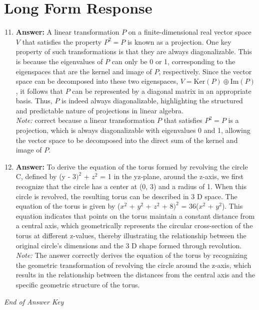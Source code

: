 \documentclass[12pt]{article}
\begin{document}
\section*{Long Form Response}
\begin{enumerate}[label=\arabic*.]
\setcounter{enumi}{10}
\item \textbf{Answer:} A linear transformation \( P \) on a finite-dimensional real vector space \( V \) that satisfies the property \( P^2 = P \) is known as a projection. One key property of such transformations is that they are always diagonalizable. This is because the eigenvalues of \( P \) can only be 0 or 1, corresponding to the eigenspaces that are the kernel and image of \( P \), respectively. Since the vector space can be decomposed into these two eigenspaces, \( V = \text{Ker}(P) \oplus \text{Im}(P) \), it follows that \( P \) can be represented by a diagonal matrix in an appropriate basis. Thus, \( P \) is indeed always diagonalizable, highlighting the structured and predictable nature of projections in linear algebra.
\\ \textit{Note:} correct because a linear transformation \( P \) that satisfies \( P^2 = P \) is a projection, which is always diagonalizable with eigenvalues 0 and 1, allowing the vector space to be decomposed into the direct sum of the kernel and image of \( P \).
\item \textbf{Answer:} To derive the equation of the torus formed by revolving the circle C, defined by (y - $3)^2$ + $z^2$ = 1 in the yz-plane, around the z-axis, we first recognize that the circle has a center at (0, 3) and a radius of 1. When this circle is revolved, the resulting torus can be described in 3 D space. The equation of the torus is given by ($x^2$ + $y^2$ + $z^2$ + $8)^2$ = 36($x^2$ + $y^2$). This equation indicates that points on the torus maintain a constant distance from a central axis, which geometrically represents the circular cross-section of the torus at different z-values, thereby illustrating the relationship between the original circle's dimensions and the 3 D shape formed through revolution.
\\ \textit{Note:} The answer correctly derives the equation of the torus by recognizing the geometric transformation of revolving the circle around the z-axis, which results in the relationship between the distances from the central axis and the specific geometric structure of the torus.
\end{enumerate}

\vfill
\noindent\textit{End of Answer Key}
\end{document}
